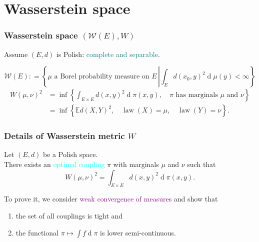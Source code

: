 \documentclass[aspectratio=169]{beamer}
\newcommand{\diff}{\operatorname{d}}
\begin{document}
\begin{frame}
\end{frame}

\section{Wasserstein space}
\begin{frame}
	\frametitle{Wasserstein space $(\mathcal{W}(E), W)$}
	Assume $(E,d)$ is Polish:
	\textcolor{teal}{complete and separable}.


	\[
		\mathcal{W}(E): = \left\{ \mu \text{ a Borel probability measure on } E \, \left|
		\int_{E} d(x_0, y)^2 \diff \mu (y) < \infty \right. \right\}
	\]
	\pause
	\begin{align*}
		W ( \mu , \nu )^2
		 & = \inf \left\{ \int _ { E \times E} d ( x , y ) ^ 2 \diff \pi ( x , y )
		,\quad \pi \text{ has marginals } \mu \text{ and } \nu \right\}            \\
		 & = \inf \left\{  \mathbb{ E } d ( X , Y ) ^2
		, \quad \operatorname { law } ( X ) = \mu , \quad \operatorname { law } ( Y ) = \nu \right\}.
	\end{align*}
\end{frame}

\begin{frame}
	\frametitle{Details of Wasserstein metric $W$}
	\begin{theorem}
		Let $(E,d)$ be a Polish space.\\
		There exists an \textcolor{cyan}{optimal coupling}
		$\pi$ with marginals $\mu$ and $\nu$ such that
		\[
			W(\mu, \nu)^2 =
			\int _ { E \times E} d ( x , y ) ^ 2 \diff \pi ( x , y ).
		\]
	\end{theorem}
	\pause
	To prove it, we consider \textcolor{purple}{weak convergence of measures} and show that
	\begin{enumerate}
		\item the set of all couplings is tight and
		\item the functional $\pi \mapsto \int f \diff \pi$ is lower semi-continuous.
	\end{enumerate}
\end{frame}
\end{document}
